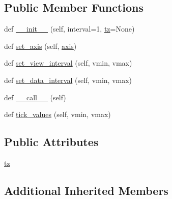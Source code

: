 \subsection*{Public Member Functions}
\begin{DoxyCompactItemize}
\item 
def \hyperlink{classmatplotlib_1_1dates_1_1MicrosecondLocator_a8bd8bb6a6688e3e24062ddfc161f1f31}{\+\_\+\+\_\+init\+\_\+\+\_\+} (self, interval=1, \hyperlink{classmatplotlib_1_1dates_1_1MicrosecondLocator_a525890ca6ae73c35dbe874579842c77e}{tz}=None)
\item 
def \hyperlink{classmatplotlib_1_1dates_1_1MicrosecondLocator_a2315077c779a3cf14c677e36e0f9f431}{set\+\_\+axis} (self, \hyperlink{classmatplotlib_1_1ticker_1_1TickHelper_a22c5bc260545f95f9674da1311e8a0d9}{axis})
\item 
def \hyperlink{classmatplotlib_1_1dates_1_1MicrosecondLocator_a91b62e05c7962594bc0f621eb84be351}{set\+\_\+view\+\_\+interval} (self, vmin, vmax)
\item 
def \hyperlink{classmatplotlib_1_1dates_1_1MicrosecondLocator_a64a65ed8290a692230a8cf7927197b49}{set\+\_\+data\+\_\+interval} (self, vmin, vmax)
\item 
def \hyperlink{classmatplotlib_1_1dates_1_1MicrosecondLocator_affe8157dda20e0073f46df13b19f6e0b}{\+\_\+\+\_\+call\+\_\+\+\_\+} (self)
\item 
def \hyperlink{classmatplotlib_1_1dates_1_1MicrosecondLocator_ac21967f4c5e9cbf38d9cd7e6f8856a82}{tick\+\_\+values} (self, vmin, vmax)
\end{DoxyCompactItemize}
\subsection*{Public Attributes}
\begin{DoxyCompactItemize}
\item 
\hyperlink{classmatplotlib_1_1dates_1_1MicrosecondLocator_a525890ca6ae73c35dbe874579842c77e}{tz}
\end{DoxyCompactItemize}
\subsection*{Additional Inherited Members}


